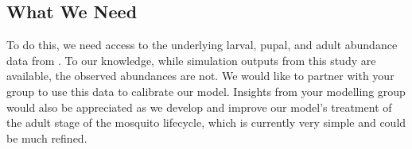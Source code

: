 \documentclass{article}
\begin{document}
\subsection*{What We Need}
To do this, we need access to the underlying larval, pupal, and adult abundance data from \cite{gunning2022critical}. To our knowledge, while simulation outputs from this study are available, the observed abundances are not. We would like to partner with your group to use this data to calibrate our model. Insights from your modelling group would also be appreciated as we develop and improve our model's treatment of the adult stage of the mosquito lifecycle, which is currently very simple and could be much refined.


\end{document}
